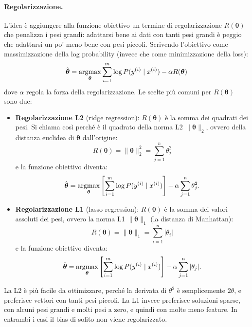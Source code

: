 \paragraph{Regolarizzazione.} L'idea è aggiungere alla funzione obiettivo un termine di regolarizzazione $R(\boldsymbol{\theta})$ che penalizza i pesi grandi: adattarsi bene ai dati con tanti pesi grandi è peggio che adattarsi un po' meno bene con pesi piccoli. Scrivendo l'obiettivo come massimizzazione della log probability (invece che come minimizzazione della loss):
\begin{equation}
\hat{\boldsymbol{\theta}} = \operatorname*{argmax}_{\boldsymbol{\theta}} \sum_{i=1}^{m} \log P(y^{(i)} \mid x^{(i)}) - \alpha R(\boldsymbol{\theta})
\end{equation}
dove $\alpha$ regola la forza della regolarizzazione. Le scelte più comuni per $R(\boldsymbol{\theta})$ sono due:
\begin{itemize}
    \item \textbf{Regolarizzazione L2} (ridge regression): $R(\boldsymbol{\theta})$ è la somma dei quadrati dei pesi. Si chiama così perché è il quadrato della norma L2 $\|\boldsymbol{\theta}\|_2$, ovvero della distanza euclidea di $\boldsymbol{\theta}$ dall'origine:
    \begin{equation}
    R(\boldsymbol{\theta}) = \|\boldsymbol{\theta}\|_2^2 = \sum_{j=1}^{n} \theta_j^2
    \end{equation}
    e la funzione obiettivo diventa:
    \begin{equation}
    \hat{\boldsymbol{\theta}} = \operatorname*{argmax}_{\boldsymbol{\theta}} \left[\sum_{i=1}^{m} \log P(y^{(i)} \mid x^{(i)})\right] - \alpha \sum_{j=1}^{n} \theta_j^2.
    \end{equation}
    \item \textbf{Regolarizzazione L1} (lasso regression): $R(\boldsymbol{\theta})$ è la somma dei valori assoluti dei pesi, ovvero la norma L1 $\|\boldsymbol{\theta}\|_1$ (la distanza di Manhattan):
    \begin{equation}
    R(\boldsymbol{\theta}) = \|\boldsymbol{\theta}\|_1 = \sum_{i=1}^{n} |\theta_i|
    \end{equation}
    e la funzione obiettivo diventa:
    \begin{equation}
    \hat{\boldsymbol{\theta}} = \operatorname*{argmax}_{\boldsymbol{\theta}} \left[\sum_{i=1}^{m} \log P(y^{(i)} \mid x^{(i)})\right] - \alpha \sum_{j=1}^{n} |\theta_j|.
    \end{equation}
\end{itemize}
La L2 è più facile da ottimizzare, perché la derivata di $\theta^2$ è semplicemente $2\theta$, e preferisce vettori con tanti pesi piccoli. La L1 invece preferisce soluzioni sparse, con alcuni pesi grandi e molti pesi a zero, e quindi con molte meno feature. In entrambi i casi il bias di solito non viene regolarizzato.

